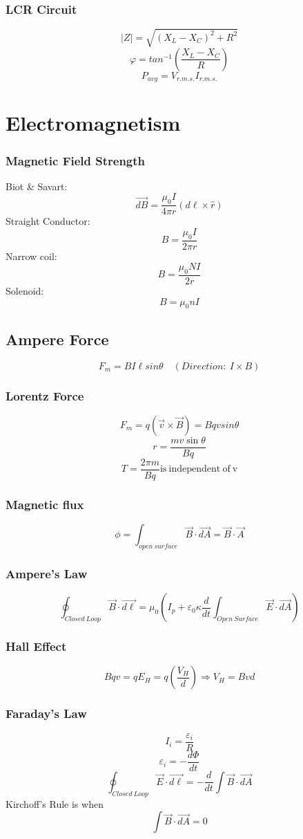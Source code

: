 \documentclass{article}
\begin{document}
\subsubsection*{LCR Circuit}
\[|Z|=\sqrt{(X_L-X_C)^2+R^2}\]
\[\varphi=tan^{-1}(\frac{X_L-X_C}{R})\]
\[P_{avg}=V_{r.m.s.}I_{r.m.s.}\]

\section{Electromagnetism}
\subsubsection*{Magnetic Field Strength}
Biot \& Savart:
\[\vec{dB}=\frac{\mu_0 I}{4\pi r}(d\ell \times \hat{r})\]
Straight Conductor:
\[B=\frac{\mu_0 I}{2\pi r}\]
Narrow coil:
\[B=\frac{\mu_0 NI}{2r}\]
Solenoid:
\[B=\mu_0 nI\]

\subsection*{Ampere Force}
\[F_m=BI\ell sin\theta \quad (Direction:\ I \times B)\]

\subsubsection*{Lorentz Force}
\[F_m=q(\vec{v}\times\vec{B})=Bqv sin\theta\]
\[r=\frac{mv\sin\theta}{Bq}\]
\[T=\frac{2\pi m}{Bq} \mathrm{is\ independent\ of\ v}\]

\subsubsection*{Magnetic flux}
\[\phi=\int_{open\ surface}\vec{B}\cdot\vec{dA}=\vec{B}\cdot\vec{A}\]

\subsubsection*{Ampere's Law}
\[\oint_{Closed\ Loop}\vec{B}\cdot\vec{d\ell}=\mu_0(I_p+\varepsilon_0\kappa\frac{d}{dt}\int_{Open\ Surface}\vec{E}\cdot\vec{dA})\]

\subsubsection*{Hall Effect}
\[Bqv=qE_H=q(\frac{V_H}{d})\Rightarrow V_H=Bvd\]

\subsubsection*{Faraday's Law}
\[I_i=\frac{\varepsilon_i}{R}\]
\[\varepsilon_i=-\frac{d\Phi}{dt}\]
\[\oint_{Closed\ Loop}\vec{E}\cdot \vec{d\ell}=-\frac{d}{dt}\int\vec{B}\cdot\vec{dA}\]
Kirchoff's Rule is when 
\[\int\vec{B}\cdot\vec{dA}=0\]
\end{document}
